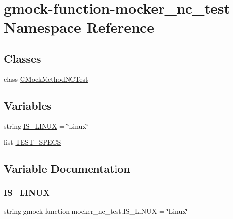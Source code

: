 \hypertarget{namespacegmock-function-mocker__nc__test}{}\section{gmock-\/function-\/mocker\+\_\+nc\+\_\+test Namespace Reference}
\label{namespacegmock-function-mocker__nc__test}
\subsection*{Classes}
\begin{DoxyCompactItemize}
\item 
class \mbox{\hyperlink{classgmock-function-mocker__nc__test_1_1_g_mock_method_n_c_test}{G\+Mock\+Method\+N\+C\+Test}}
\end{DoxyCompactItemize}
\subsection*{Variables}
\begin{DoxyCompactItemize}
\item 
string \mbox{\hyperlink{namespacegmock-function-mocker__nc__test_a4cc17022e27f8f79f2f7c7c450467a61}{I\+S\+\_\+\+L\+I\+N\+UX}} = \char`\"{}Linux\char`\"{}
\item 
list \mbox{\hyperlink{namespacegmock-function-mocker__nc__test_a09b8adf2531ae1ea7111c5dfa346e7fa}{T\+E\+S\+T\+\_\+\+S\+P\+E\+CS}}
\end{DoxyCompactItemize}


\subsection{Variable Documentation}
\mbox{\label{namespacegmock-function-mocker__nc__test_a4cc17022e27f8f79f2f7c7c450467a61}} 
\subsubsection{\texorpdfstring{IS\_LINUX}{IS\_LINUX}}
{\footnotesize\ttfamily string gmock-\/function-\/mocker\+\_\+nc\+\_\+test.\+I\+S\+\_\+\+L\+I\+N\+UX = \char`\"{}Linux\char`\"{}}

